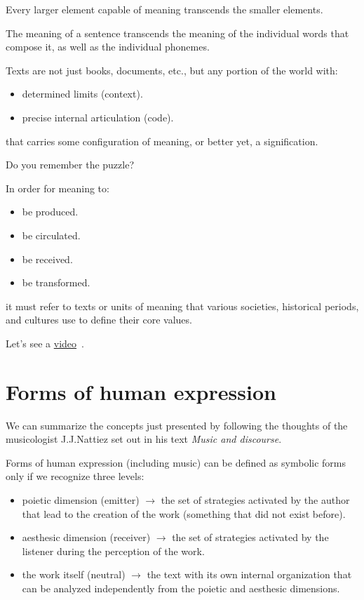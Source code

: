 Every larger element capable of meaning transcends the smaller elements.

The meaning of a sentence transcends the meaning of the individual words that compose it, as well as the individual phonemes.

Texts are not just books, documents, etc., but any portion of the world with:

\begin{itemize}
\tightlist\item determined limits (context).
\item precise internal articulation (code).
\end{itemize}

that carries some configuration of meaning, or better yet, a signification.

Do you remember the puzzle?

In order for meaning to:

\begin{itemize}
\tightlist\item be produced.
\item be circulated.
\item be received.
\item be transformed.
\end{itemize}

it must refer to texts or units of meaning that various societies, historical periods, and cultures use to define their core values.

Let's see a \href{http://www.musicaecodice.it/on_server/media/1_media/storia1.mp4}{video}~\cite{morri}.

\section{Forms of human expression}\label{forms-of-human-expression}

We can summarize the concepts just presented by following the thoughts of the musicologist J.J.Nattiez set out in his text \textit{Music and discourse}.

Forms of human expression (including music) can be defined as symbolic forms only if we recognize three levels:

\begin{itemize}
\tightlist\item poietic dimension (emitter) \(\rightarrow\) the set of strategies activated by the author that lead to the creation of the work (something that did not exist before).
\item aesthesic dimension (receiver) \(\rightarrow\) the set of strategies activated by the listener during the perception of the work.
\item the work itself (neutral) \(\rightarrow\) the text with its own internal organization that can be analyzed independently from the poietic and aesthesic dimensions.
\end{itemize}

